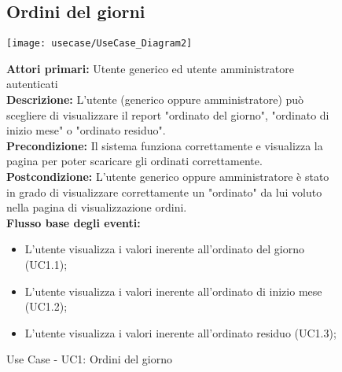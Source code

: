 \begin{figure}[h!]
\subsection{Ordini del giorni}

   \begin{center}
    \texttt{[image: usecase/UseCase\_Diagram2]} 
    \caption{Use Case - UC1: Ordini del giorno}
    \end{center}



\textbf{Attori primari:} Utente generico ed utente amministratore autenticati
\\


\textbf{Descrizione:} L'utente (generico oppure amministratore) può scegliere di visualizzare il report "ordinato del giorno", "ordinato di inizio mese" o "ordinato residuo". \\

\textbf{Precondizione:} Il sistema funziona correttamente e visualizza la pagina per poter scaricare gli ordinati correttamente. \\

\textbf{Postcondizione:}  L'utente generico oppure amministratore è stato in grado di visualizzare correttamente  un "ordinato" da lui voluto nella pagina di visualizzazione ordini. \\


\textbf{Flusso base degli eventi:} 

\begin{itemize}
\item L'utente visualizza i valori inerente all'ordinato del giorno (UC1.1);
\item L'utente visualizza i valori inerente all'ordinato di inizio mese (UC1.2);
\item L'utente visualizza i valori inerente all'ordinato residuo (UC1.3);
\end{itemize}
\end{figure} 






